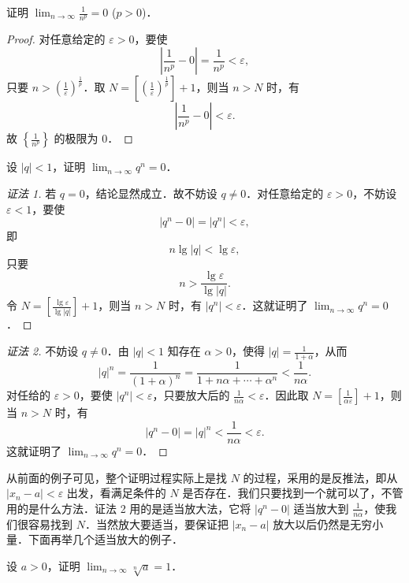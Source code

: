 \begin{example}\label{ex:3-2-6}
证明 $\lim_{n\to\infty}\frac{1}{n^p} = 0$ ($p>0$)．
\end{example}

\begin{proof}
对任意给定的 $\varepsilon>0$，要使
\[
\left|\frac{1}{n^p} - 0\right| = \frac{1}{n^p} < \varepsilon,
\]
只要 $n > \left(\frac{1}{\varepsilon}\right)^{\frac{1}{p}}$．取 $N = \left[\left(\frac{1}{\varepsilon}\right)^{\frac{1}{p}}\right] + 1$，则当 $n > N$ 时，有
\[
\left|\frac{1}{n^p} - 0\right| < \varepsilon.
\]
故 $\left\{\frac{1}{n^p}\right\}$ 的极限为 $0$．
\end{proof}

\begin{example}\label{ex:3-2-7}
设 $|q|<1$，证明 $\lim_{n\to\infty}q^n = 0$．
\end{example}

\begin{proof}[证法 1]
若 $q = 0$，结论显然成立．故不妨设 $q \neq 0$．对任意给定的 $\varepsilon > 0$，不妨设 $\varepsilon < 1$，要使
\[
|q^n - 0| = |q^n| < \varepsilon,
\]
即
\[
n\lg|q| < \lg\varepsilon,
\]
只要
\[
n > \frac{\lg\varepsilon}{\lg|q|}.
\]
令 $N = \left[\frac{\lg\varepsilon}{\lg|q|}\right] + 1$，则当 $n > N$ 时，有 $|q^n| < \varepsilon$．这就证明了 $\lim_{n \to \infty} q^n = 0$．
\end{proof}

\begin{proof}[证法 2]
不妨设 $q \neq 0$．由 $|q| < 1$ 知存在 $\alpha > 0$，使得 $|q| = \frac{1}{1 + \alpha}$，从而
\[
|q|^n = \frac{1}{(1 + \alpha)^n} = \frac{1}{1 + n\alpha + \cdots + \alpha^n} < \frac{1}{n\alpha}.
\]
对任给的 $\varepsilon > 0$，要使 $|q^n| < \varepsilon$，只要放大后的 $\frac{1}{n\alpha} < \varepsilon$．因此取 $N = \left[\frac{1}{\alpha\varepsilon}\right] + 1$，则当 $n > N$ 时，有
\[
|q^n - 0| = |q|^n < \frac{1}{n\alpha} < \varepsilon.
\]
这就证明了 $\lim_{n\to\infty}q^n = 0$．
\end{proof}

从前面的例子可见，整个证明过程实际上是找 $N$ 的过程，采用的是反推法，即从 $|x_n - a| < \varepsilon$ 出发，看满足条件的 $N$ 是否存在．我们只要找到一个就可以了，不管用的是什么方法．证法 2 用的是适当放大法，它将 $|q^n - 0|$ 适当放大到 $\frac{1}{n\alpha}$，使我们很容易找到 $N$．当然放大要适当，要保证把 $|x_n - a|$ 放大以后仍然是无穷小量．下面再举几个适当放大的例子．

\begin{example}\label{ex:3-2-8}
设 $a > 0$，证明 $\lim_{n \to \infty} \sqrt[n]{a} = 1$．
\end{example}

